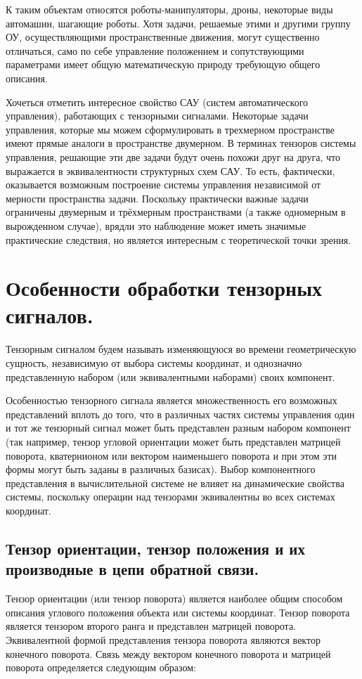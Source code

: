 \documentclass[a4paper]{article}
\begin{document}
К таким объектам относятся роботы-манипуляторы, дроны, некоторые виды автомашин, шагающие роботы. 
Хотя задачи, решаемые этими и другими группу ОУ, осуществляющими пространственные движения, могут существенно отличаться, само по себе управление положением и сопутствующими параметрами имеет общую математическую природу требующую общего описания.

Хочеться отметить интересное свойство САУ (систем автоматического управления), работающих с тензорными сигналами. Некоторые задачи управления, которые мы можем сформулировать в трехмерном пространстве имеют прямые аналоги в пространстве двумерном. В терминах тензоров системы управления, решающие эти две задачи будут очень похожи друг на друга, что выражается в эквивалентности структурных схем САУ. То есть, фактически, оказывается возможным построение системы управления независимой от мерности пространства задачи. Поскольку практически важные задачи ограничены двумерным и трёхмерным пространствами (а также одномерным в вырожденном случае), врядли это наблюдение может иметь значимые практические следствия, но является интересным с теоретической точки зрения. 

\section{Особенности обработки тензорных сигналов.}
Тензорным сигналом будем называть изменяющуюся во времени геометрическую сущность, независимую от выбора системы координат, и однозначно представленную набором (или эквивалентными наборами) своих компонент. 

Особенностью тензорного сигнала является множественность его возможных представлений вплоть до того, что в различных частях системы управления один и тот же тензорный сигнал может быть представлен разным набором компонент (так например, тензор угловой ориентации может быть представлен матрицей поворота, кватернионом или вектором наименьшего поворота и при этом эти формы могут быть заданы в различных базисах). Выбор компонентного представления в вычислительной системе не влияет на динамические свойства системы, поскольку операции над тензорами эквивалентны во всех системах координат.

\subsection{Тензор ориентации, тензор положения и их производные в цепи обратной связи. }
Тензор ориентации (или тензор поворота) является наиболее общим способом описания углового положения объекта или системы координат. Тензор поворота является тензором второго ранга и представлен матрицей поворота. Эквивалентной формой представления тензора поворота являются вектор конечного поворота. Связь между вектором конечного поворота и матрицей поворота определяется следующим образом:
\end{document}
